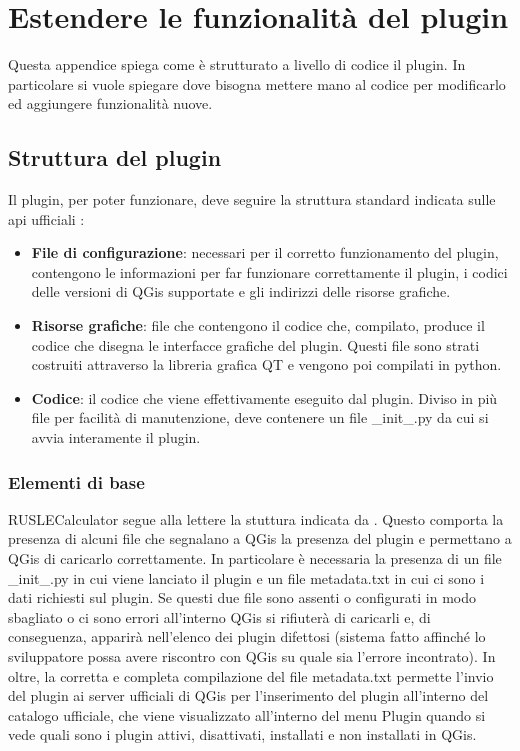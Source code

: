 

\chapter{Estendere le funzionalità del plugin}
\label{cap:appendice}
Questa appendice spiega come è strutturato a livello di codice il plugin. In particolare si vuole spiegare dove bisogna mettere mano al codice per modificarlo ed aggiungere funzionalità nuove.

\section{Struttura del plugin}
Il plugin, per poter funzionare, deve seguire la struttura standard indicata sulle api ufficiali \cite{site:qgisapi}:
\begin{itemize}
	\item \textbf{File di configurazione}: necessari per il corretto funzionamento del plugin, contengono le informazioni per far funzionare correttamente il plugin, i codici delle versioni di QGis supportate e gli indirizzi delle risorse grafiche. 
	\item \textbf{Risorse grafiche}: file che contengono il codice che, compilato, produce il codice che disegna le interfacce grafiche del plugin. Questi file sono strati costruiti attraverso la libreria grafica QT e vengono poi compilati in python.
	\item \textbf{Codice}: il codice che viene effettivamente eseguito dal plugin. Diviso in più file per facilità di manutenzione, deve contenere un file \_init\_.py da cui si avvia interamente il plugin.
\end{itemize}

\subsection{Elementi di base}
RUSLECalculator segue alla lettere la stuttura indicata da \cite{site:qgisapi}. Questo comporta la presenza di alcuni file che segnalano a QGis la presenza del plugin e permettano a QGis di caricarlo correttamente.
In particolare è necessaria la presenza di un file \_init\_.py in cui viene lanciato il plugin e un file metadata.txt in cui ci sono i dati richiesti sul plugin. Se questi due file sono assenti o configurati in modo sbagliato o ci sono errori all'interno QGis si rifiuterà di caricarli e, di conseguenza, apparirà nell'elenco dei plugin difettosi (sistema fatto affinché lo sviluppatore possa avere riscontro con QGis su quale sia l'errore incontrato).
In oltre, la corretta e completa compilazione del file metadata.txt permette l'invio del plugin ai server ufficiali di QGis per l'inserimento del plugin all'interno del catalogo ufficiale, che viene visualizzato all'interno del menu Plugin quando si vede quali sono i plugin attivi, disattivati, installati e non installati in QGis.

